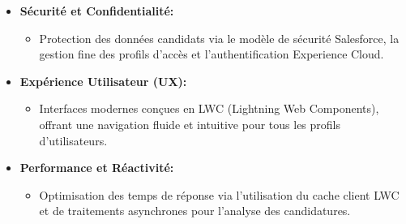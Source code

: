 \hspace{0.5cm}

\begin{itemize}
    \item \textbf{Sécurité et Confidentialité:}
     \begin{itemize}
        \item[--] Protection des données candidats via le modèle de sécurité Salesforce, la gestion fine des profils d'accès et l'authentification Experience Cloud.
    \end{itemize}
\hspace{0.5cm}     

    \item \textbf{Expérience Utilisateur (UX):}
     \begin{itemize}
        \item[--] Interfaces modernes conçues en LWC (Lightning Web Components), offrant une navigation fluide et intuitive pour tous les profils d'utilisateurs.
    \end{itemize}
\hspace{0.5cm}
    \item \textbf{Performance et Réactivité:}
     \begin{itemize}
        \item[--] Optimisation des temps de réponse via l'utilisation du cache client LWC et de traitements asynchrones pour l'analyse des candidatures.
    \end{itemize}
\hspace{0.5cm}
\end{itemize}
